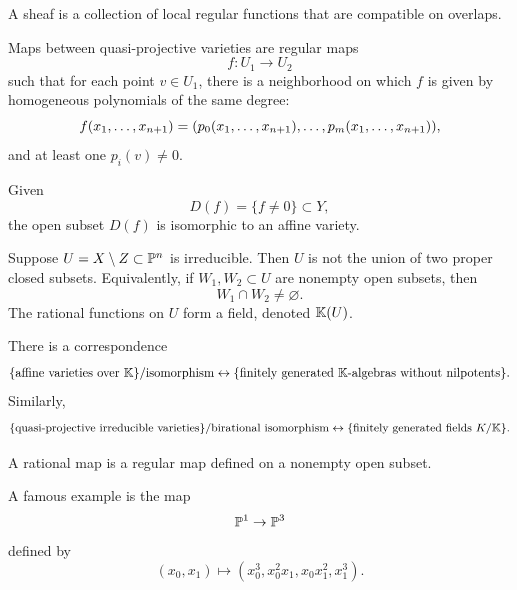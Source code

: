 \begin{definition}[Sheaf]
    A sheaf is a collection of local regular functions that are compatible on overlaps.
\end{definition}

Maps between quasi-projective varieties are regular maps
\[
    f:U_1\to U_2
\]
such that for each point $v\in U_1$, there is a neighborhood on which $f$ is given by homogeneous polynomials of the same degree:
\[
    f(x_{1},\ldots,x_{n+1}) = (p_0(x_{1},\ldots,x_{n+1}), \ldots, p_m(x_{1},\ldots,x_{n+1})),
\]
and at least one $p_i(v)\neq 0$.

\begin{corollary}{
    Given
    \[
        D(f) = \{f\neq 0\}\subset Y,
    \]
    the open subset $D(f)$ is isomorphic to an affine variety.
}
\end{corollary}

\begin{lemma*}{
    Suppose $U = X\setminus Z\subset \mathbb{P}^n$ is irreducible.
    Then $U$ is not the union of two proper closed subsets.
    Equivalently, if $W_1,W_2\subset U$ are nonempty open subsets, then
    \[
        W_1\cap W_2\neq \varnothing.
    \]
    The rational functions on $U$ form a field, denoted $\mathbb{K}(U)$.
}
\end{lemma*}

\begin{lemma*}{
    There is a correspondence
    \[
        \{\text{affine varieties over $\mathbb{K}$}\}/\text{isomorphism}
        \leftrightarrow
        \{\text{finitely generated $\mathbb{K}$-algebras without nilpotents}\}.
    \]
    Similarly,
    \[
        \{\text{quasi-projective irreducible varieties}\}/\text{birational isomorphism}
        \leftrightarrow
        \{\text{finitely generated fields }K/\mathbb{K}\}.
    \]
}
\end{lemma*}

\begin{definition}
    A rational map is a regular map defined on a nonempty open subset.
\end{definition}

A famous example is the map
\[
    \mathbb{P}^1 \to \mathbb{P}^3
\]
defined by
\[
    (x_0,x_1)\mapsto (x_0^3,x_0^{2}x_1,x_{0}x_1^2,x_1^3).
\]
